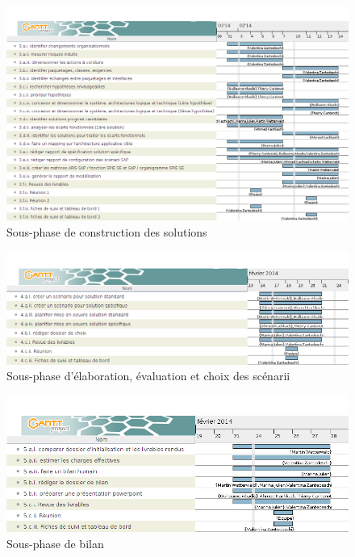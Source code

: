 \begin{figure}[h]
    \centering
    \includegraphics[width=150mm]{images/Gantt_3.png}
    \caption{Sous-phase de construction des solutions}
    \label{diagram:si_map}
\end{figure}

\begin{figure}[h]
    \centering
    \includegraphics[scale=0.65]{images/Gantt_4.png}
    \caption{Sous-phase d'élaboration, évaluation et choix des scénarii}
    \label{diagram:si_map}
\end{figure}

\begin{figure}[h]
    \centering
    \includegraphics[scale=0.6]{images/Gantt_5.png}
    \caption{Sous-phase de bilan}
    \label{diagram:si_map}
\end{figure}

